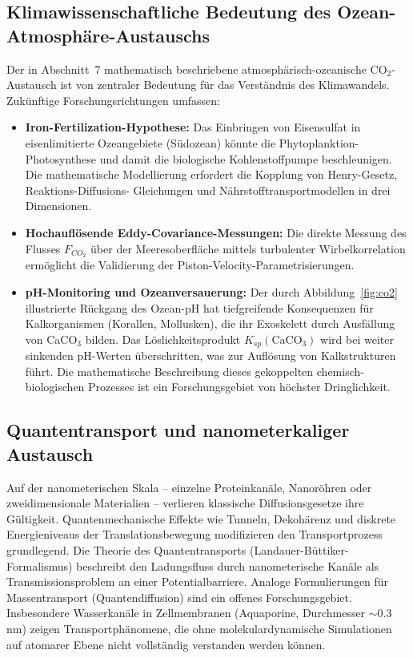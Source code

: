 ﻿\documentclass[a4paper,12pt]{article}
\theoremstyle{definition}
\begin{document}
\subsection{Klimawissenschaftliche Bedeutung des Ozean-Atmosphäre-Austauschs}

Der in Abschnitt~7 mathematisch beschriebene atmosphärisch-ozeanische CO$_2$-Austausch
ist von zentraler Bedeutung für das Verständnis des Klimawandels. Zukünftige
Forschungsrichtungen umfassen:
\begin{itemize}
    \item \textbf{Iron-Fertilization-Hypothese:} Das Einbringen von Eisensulfat in
          eisenlimitierte Ozeangebiete (Südozean) könnte die Phytoplanktion-Photosynthese
          und damit die biologische Kohlenstoffpumpe beschleunigen. Die mathematische
          Modellierung erfordert die Kopplung von Henry-Gesetz, Reaktions-Diffusions-
          Gleichungen und Nährstofftransportmodellen in drei Dimensionen.
    \item \textbf{Hochauflösende Eddy-Covariance-Messungen:} Die direkte Messung des
          Flusses $F_{CO_2}$ über der Meeresoberfläche mittels turbulenter Wirbelkorrelation
          ermöglicht die Validierung der Piston-Velocity-Parametrisierungen.
    \item \textbf{pH-Monitoring und Ozeanversauerung:} Der durch Abbildung~\ref{fig:co2}
          illustrierte Rückgang des Ozean-pH hat tiefgreifende Konsequenzen für
          Kalkorganismen (Korallen, Mollusken), die ihr Exoskelett durch Ausfällung
          von CaCO$_3$ bilden. Das Löslichkeitsprodukt $K_{sp}(\mathrm{CaCO_3})$
          wird bei weiter sinkenden pH-Werten überschritten, was zur Auflösung von
          Kalkstrukturen führt. Die mathematische Beschreibung dieses gekoppelten
          chemisch-biologischen Prozesses ist ein Forschungsgebiet von höchster
          Dringlichkeit.
\end{itemize}

\subsection{Quantentransport und nanometerkaliger Austausch}

Auf der nanometerischen Skala -- einzelne Proteinkanäle, Nanoröhren oder
zweidimensionale Materialien -- verlieren klassische Diffusionsgesetze ihre
Gültigkeit. Quantenmechanische Effekte wie Tunneln, Dekohärenz und diskrete
Energieniveaus der Translationsbewegung modifizieren den Transportprozess
grundlegend. Die Theorie des Quantentransports (Landauer-Büttiker-Formalismus)
beschreibt den Ladungsfluss durch nanometerische Kanäle als Transmissionsproblem
an einer Potentialbarriere. Analoge Formulierungen für Massentransport (Quantendiffusion)
sind ein offenes Forschungsgebiet. Insbesondere Wasserkanäle in Zellmembranen
(Aquaporine, Durchmesser $\sim 0.3$\,nm) zeigen Transportphänomene, die ohne
molekulardynamische Simulationen auf atomarer Ebene nicht vollständig verstanden
werden können.
\end{document}
